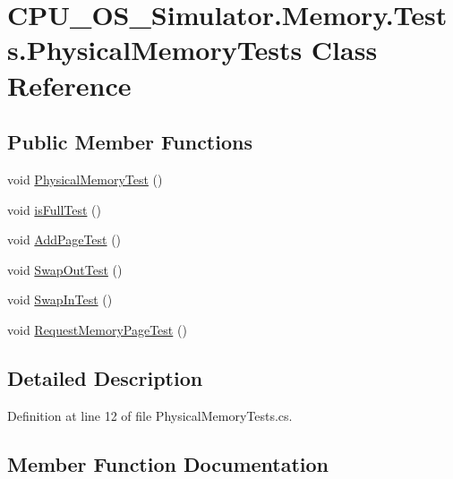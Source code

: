 \hypertarget{class_c_p_u___o_s___simulator_1_1_memory_1_1_tests_1_1_physical_memory_tests}{}\section{C\+P\+U\+\_\+\+O\+S\+\_\+\+Simulator.\+Memory.\+Tests.\+Physical\+Memory\+Tests Class Reference}
\label{class_c_p_u___o_s___simulator_1_1_memory_1_1_tests_1_1_physical_memory_tests}
\subsection*{Public Member Functions}
\begin{DoxyCompactItemize}
\item 
void \hyperlink{class_c_p_u___o_s___simulator_1_1_memory_1_1_tests_1_1_physical_memory_tests_a9acd5bb86fefb641a34e5dba0925a07c}{Physical\+Memory\+Test} ()
\item 
void \hyperlink{class_c_p_u___o_s___simulator_1_1_memory_1_1_tests_1_1_physical_memory_tests_ab5ecda8731079f7b879f48b26ce1c44f}{is\+Full\+Test} ()
\item 
void \hyperlink{class_c_p_u___o_s___simulator_1_1_memory_1_1_tests_1_1_physical_memory_tests_a04e3aa7ffdbdafef1e6d3d4dfdfccf61}{Add\+Page\+Test} ()
\item 
void \hyperlink{class_c_p_u___o_s___simulator_1_1_memory_1_1_tests_1_1_physical_memory_tests_a1638d8f03d0fa3a3429622bbf7cadf35}{Swap\+Out\+Test} ()
\item 
void \hyperlink{class_c_p_u___o_s___simulator_1_1_memory_1_1_tests_1_1_physical_memory_tests_abaf623d204bcbfb38a38f73c9d525385}{Swap\+In\+Test} ()
\item 
void \hyperlink{class_c_p_u___o_s___simulator_1_1_memory_1_1_tests_1_1_physical_memory_tests_aa8042e378e7e1db7666bed84ec4025c3}{Request\+Memory\+Page\+Test} ()
\end{DoxyCompactItemize}


\subsection{Detailed Description}


Definition at line 12 of file Physical\+Memory\+Tests.\+cs.



\subsection{Member Function Documentation}
\hypertarget{class_c_p_u___o_s___simulator_1_1_memory_1_1_tests_1_1_physical_memory_tests_a04e3aa7ffdbdafef1e6d3d4dfdfccf61}{}
